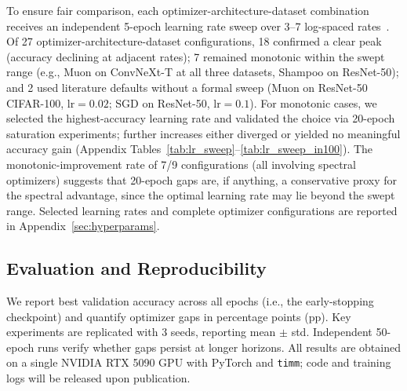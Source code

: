 To ensure fair comparison, each optimizer-architecture-dataset combination receives an independent 5-epoch learning rate sweep over 3--7 log-spaced rates~\cite{schmidt2021crowdedvalley}.
Of 27 optimizer-architecture-dataset configurations, 18 confirmed a clear peak (accuracy declining at adjacent rates); 7 remained monotonic within the swept range (e.g., Muon on ConvNeXt-T at all three datasets, Shampoo on ResNet-50); and 2 used literature defaults without a formal sweep (Muon on ResNet-50 CIFAR-100, $\text{lr}{=}0.02$; SGD on ResNet-50, $\text{lr}{=}0.1$).
For monotonic cases, we selected the highest-accuracy learning rate and validated the choice via 20-epoch saturation experiments; further increases either diverged or yielded no meaningful accuracy gain (Appendix Tables~\ref{tab:lr_sweep}--\ref{tab:lr_sweep_in100}).
The monotonic-improvement rate of 7/9 configurations (all involving spectral optimizers) suggests that 20-epoch gaps are, if anything, a conservative proxy for the spectral advantage, since the optimal learning rate may lie beyond the swept range.
Selected learning rates and complete optimizer configurations are reported in Appendix~\ref{sec:hyperparams}.

\subsection{Evaluation and Reproducibility}
\label{sec:eval_protocol}

We report best validation accuracy across all epochs (i.e., the early-stopping checkpoint) and quantify optimizer gaps in percentage points (pp). Key experiments are replicated with 3 seeds, reporting mean $\pm$ std. Independent 50-epoch runs verify whether gaps persist at longer horizons. All results are obtained on a single NVIDIA RTX 5090 GPU with PyTorch and \texttt{timm}; code and training logs will be released upon publication.
\label{sec:hardware}